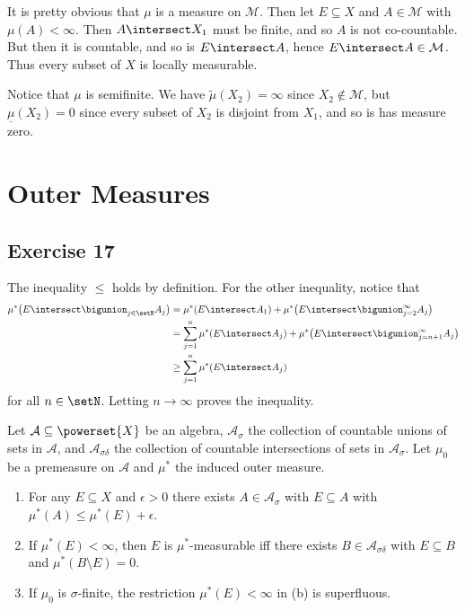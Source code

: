 \documentclass[article, a4paper, 11pt, oneside]{memoir}
\numberwithin{equation}{chapter}
\newcommand{\calM}{\mathcal{M}}
\newcommand{\calA}{\mathcal{A}}
\begin{document}
\begin{solution}
	\item It is pretty obvious that $\mu$ is a measure on $\calM$. Then let $E \subseteq X$ and $A \in \calM$ with $\mu(A) < \infty$. Then $A \intersect X_1$ must be finite, and so $A$ is not co-countable. But then it is countable, and so is $E \intersect A$, hence $E \intersect A \in \calM$. Thus every subset of $X$ is locally measurable.
	
	Notice that $\mu$ is semifinite. We have $\tilde\mu(X_2) = \infty$ since $X_2 \not\in \calM$, but $\underline\mu(X_2) = 0$ since every subset of $X_2$ is disjoint from $X_1$, and so is has measure zero.
\end{solution}


\section{Outer Measures}

\subsection{Exercise 17}

The inequality $\leq$ holds by definition. For the other inequality, notice that
%
\begin{align*}
	\mu^* \bigl( E \intersect \bigunion_{j \in \setN} A_j \bigr)
		&= \mu^*(E \intersect A_1) + \mu^* \bigl( E \intersect \bigunion_{j=2}^\infty A_j \bigr) \\
		&= \sum_{j=1}^n \mu^*(E \intersect A_j) + \mu^* \bigl( E \intersect \bigunion_{j=n+1}^\infty A_j \bigr) \\
		&\geq \sum_{j=1}^n \mu^*(E \intersect A_j)
\end{align*}
%
for all $n \in \setN$. Letting $n \to \infty$ proves the inequality.


\begin{exerciseframed*}[18]
    Let $\calA \subseteq \powerset{X}$ be an algebra, $\calA_\sigma$ the collection of countable unions of sets in $\calA$, and $\calA_{\sigma\delta}$ the collection of countable intersections of sets in $\calA_\sigma$. Let $\mu_0$ be a premeasure on $\calA$ and $\mu^*$ the induced outer measure.
    \begin{enumerate}
        \item For any $E \subseteq X$ and $\epsilon > 0$ there exists $A \in \calA_\sigma$ with $E \subseteq A$ with $\mu^*(A) \leq \mu^*(E) + \epsilon$.

        \item If $\mu^*(E) < \infty$, then $E$ is $\mu^*$-measurable iff there exists $B \in \calA_{\sigma\delta}$ with $E \subseteq B$ and $\mu^*(B \setminus E) = 0$.

        \item If $\mu_0$ is $\sigma$-finite, the restriction $\mu^*(E) < \infty$ in (b) is superfluous.
    \end{enumerate}
\end{exerciseframed*}
\end{document}
